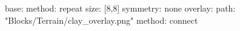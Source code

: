 base:
  method: repeat
  size: [8,8]
  symmetry: none
overlay:
  path: "Blocks/Terrain/clay_overlay.png"
  method: connect
